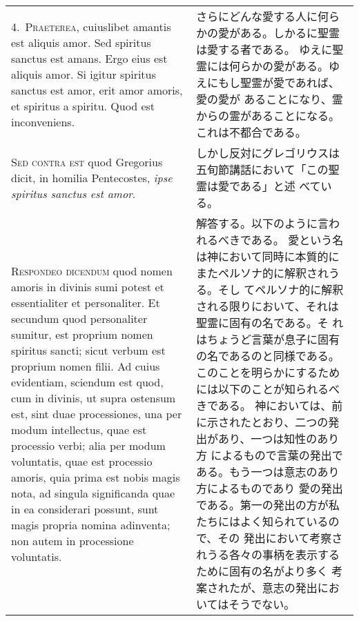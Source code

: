\documentclass[10pt]{jsarticle} %
\begin{document}
\begin{longtable}{p{21em}p{21em}}
\\



4.~{\scshape Praeterea}, cuiuslibet amantis est aliquis amor. Sed spiritus sanctus
est amans. Ergo eius est aliquis amor. Si igitur spiritus sanctus est
amor, erit amor amoris, et spiritus a spiritu. Quod est inconveniens.


&

さらにどんな愛する人に何らかの愛がある。しかるに聖霊は愛する者である。
 ゆえに聖霊には何らかの愛がある。ゆえにもし聖霊が愛であれば、愛の愛が
 あることになり、霊からの霊があることになる。これは不都合である。

\\



{\scshape Sed contra est} quod Gregorius dicit, in homilia Pentecostes, {\itshape ipse
spiritus sanctus est amor}.


&

しかし反対にグレゴリウスは五旬節講話において「この聖霊は愛である」と述
べている。

\\



{\scshape Respondeo dicendum} quod nomen amoris in divinis sumi potest et
essentialiter et personaliter. Et secundum quod personaliter sumitur,
est proprium nomen spiritus sancti; sicut verbum est proprium nomen
filii. Ad cuius evidentiam, sciendum est quod, cum in divinis, ut
supra ostensum est, sint duae processiones, una per modum intellectus,
quae est processio verbi; alia per modum voluntatis, quae est
processio amoris, quia prima est nobis magis nota, ad singula
significanda quae in ea considerari possunt, sunt magis propria nomina
adinventa; non autem in processione voluntatis. 


&

解答する。以下のように言われるべきである。
愛という名は神において同時に本質的にまたペルソナ的に解釈されうる。そし
 てペルソナ的に解釈される限りにおいて、それは聖霊に固有の名である。そ
 れはちょうど言葉が息子に固有の名であるのと同様である。
このことを明らかにするためには以下のことが知られるべきである。
神においては、前に示されたとおり、二つの発出があり、一つは知性のあり方
 によるもので言葉の発出である。もう一つは意志のあり方によるものであり
 愛の発出である。第一の発出の方が私たちにはよく知られているので、その
 発出において考察されうる各々の事柄を表示するために固有の名がより多く
 考案されたが、意志の発出においてはそうでない。


\end{longtable}
\end{document}
